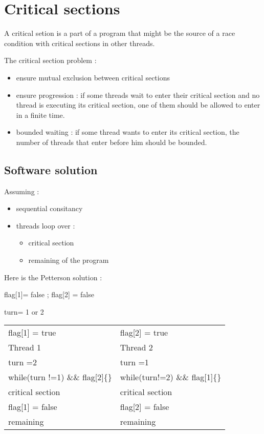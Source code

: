 \section{Critical sections}

A critical setion is a part of a program that might be the source of a race condition with critical sections in other threads.

The critical section problem :
\begin{itemize}
\item ensure mutual exclusion between critical sections
\item ensure progression : if some threads wait to enter their critical section and no thread is executing its critical section, one of them should be allowed to enter in a finite time.
\item bounded waiting : if some thread wants to enter its critical section, the number of threads that enter before him should be bounded. 
\end{itemize}

\subsection{Software solution}

Assuming :

\begin{itemize}
\item sequential consitancy
\item threads loop over :
\begin{itemize}
\item critical section
\item remaining of the program
\end{itemize}
\end{itemize}

Here is the Petterson solution :

\begin{centering}
flag[1]= false ; flag[2] = false

turn= 1 or 2

\begin{tabular}{|ll|}
\hline
	flag[1] = true & flag[2] = true\\
	Thread 1 & Thread 2 \\
	turn =2 & turn =1 \\
	while(turn !=1) \&\& flag[2]\{\} & while(turn!=2) \&\& flag[1]\{\}\\
	critical section & critical section\\
	flag[1] = false & flag[2] = false\\
	remaining & remaining\\
\hline
\end{tabular}

\end{centering}

